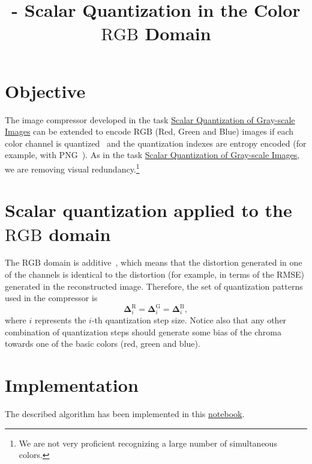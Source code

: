 

\title{\SM{} - Scalar Quantization in the Color $\text{RGB}$ Domain}

\maketitle
\tableofcontents

\section{Objective}
The image compressor developed in the task
\href{https://sistemas-multimedia.github.io/contents/gray_SQ/}{Scalar
  Quantization of Gray-scale Images} can be extended to encode
$\text{RGB}$ (Red, Green and Blue) images if each color channel is
quantized~\cite{vruiz__scalar_quantization} and the quantization
indexes are entropy encoded (for example, with
PNG~\cite{vruiz__PNG}). As in the task
\href{https://sistemas-multimedia.github.io/contents/gray_SQ/}{Scalar
  Quantization of Gray-scale Images}, we are removing visual
redundancy.\footnote{We are not very proficient recognizing a large
number of simultaneous colors.}

\section{Scalar quantization applied to the $\text{RGB}$ domain}
The $\text{RGB}$ domain is additive~\cite{burger2016digital}, which
means that the distortion generated in one of the channels is
identical to the distortion (for example, in terms of the RMSE)
generated in the reconstructed image. Therefore, the set of
quantization patterns used in the compressor is
\begin{equation}
  \mathbf{\Delta}^{\text{R}}_i = \mathbf{\Delta}^{\text{G}}_i =
  \mathbf{\Delta}^{\text{B}}_i,
  \label{eq:simple_Q}
\end{equation}
where $i$ represents the $i$-th quantization step size.  Notice also
that any other combination of quantization steps should generate some
bias of the chroma towards one of the basic colors (red, green and
blue).

\section{Implementation}
The described algorithm has been implemented in this
\href{https://github.com/Sistemas-Multimedia/Sistemas-Multimedia.github.io/blob/master/contents/RGB_SQ/RGB_SQ.ipynb}{notebook}.

